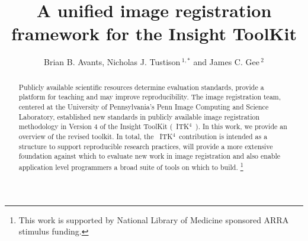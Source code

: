 \documentclass{frontiersSCNS}
\newcommand{\tk}{~ITK$^{\text{4}}$~}
\def\firstAuthorLast{Avants and Gee} %
\def\Authors{Brian B. Avants, Nicholas J. Tustison\,$^{1,*}$ and James C. Gee\,$^{2}$
 }
\begin{document}
\onecolumn
{}

\title[ITKv4 Image Registration]{A unified image registration
  framework for the Insight ToolKit}
\author[\firstAuthorLast ]{\Authors}
\address{}
\correspondance{}
\editor{}
\topic{}

\maketitle

\begin{abstract}
Publicly available scientific resources determine evaluation
standards, provide a platform for teaching and may improve
reproducibility.  The image registration team, centered at the
University of Pennsylvania's Penn Image Computing and Science
Laboratory, established new standards in publicly available image registration
methodology in Version 4 of the Insight ToolKit (\tk).  In this work,
we provide an overview of the revised toolkit.  In total, the \tk contribution is intended
as a structure to support reproducible research practices, will
provide a more extensive foundation against which to evaluate new work
in image registration and also enable application level programmers a
broad suite of tools on which to build. \footnote{This work is
supported by National Library of Medicine sponsored ARRA stimulus
funding.}
\end{abstract}
\end{document}
